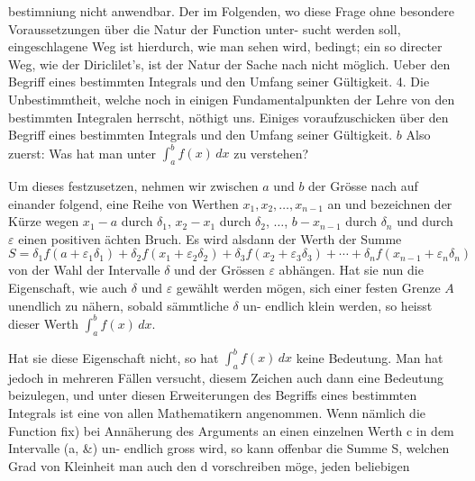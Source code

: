 \documentclass[12pt,a4paper]{book}
\theoremstyle{definition}
\theoremstyle{remark}
\begin{document}
{{%
bestimniung  nicht  anwendbar.  Der  im  Folgenden,  wo  diese  Frage
ohne  besondere  Voraussetzungen  über  die  Natur  der  Function  unter-
sucht werden  soll,  eingeschlagene  Weg  ist  hierdurch,  wie  man  sehen
wird,  bedingt;  ein  so  directer  Weg,  wie  der  Diriclilet's,  ist  der  Natur
der  Sache  nach  nicht  möglich.
Ueber  den  Begriff  eines  bestimmten  Integrals  und  den  Umfang
seiner  Gültigkeit.
4.
Die  Unbestimmtheit,  welche  noch  in  einigen  Fundamentalpunkten
der  Lehre  von  den  bestimmten  Integralen  herrscht,  nöthigt  uns.
Einiges  voraufzuschicken  über  den  Begriff  eines  bestimmten  Integrals
und  den  Umfang  seiner  Gültigkeit.
$b$
Also  zuerst:  Was  hat  man  unter  $\int_a^b f(x)\, dx$  zu  verstehen?

Um  dieses  festzusetzen,  nehmen  wir  zwischen  $a$  und  $b$  der  Grösse
nach  auf  einander  folgend,  eine  Reihe  von  Werthen  $x_1, x_2, \ldots, x_{n-1}$
an  und  bezeichnen  der  Kürze  wegen  $x_1 - a$  durch  $\delta_1$,  $x_2 - x_1$  durch
$\delta_2$,  $\ldots$,  $b - x_{n-1}$  durch  $\delta_n$  und  durch  $\varepsilon$  einen  positiven  ächten  Bruch.
Es  wird  alsdann  der  Werth  der  Summe
\[ S = \delta_1 f(a + \varepsilon_1 \delta_1) + \delta_2 f(x_1 + \varepsilon_2 \delta_2) + \delta_3 f(x_2 + \varepsilon_3 \delta_3) + \cdots + \delta_n f(x_{n-1} + \varepsilon_n \delta_n) \]
von  der  Wahl  der  Intervalle  $\delta$  und  der  Grössen  $\varepsilon$  abhängen.  Hat  sie
nun  die  Eigenschaft,  wie  auch  $\delta$  und  $\varepsilon$  gewählt  werden  mögen,  sich
einer  festen  Grenze  $A$  unendlich  zu  nähern,  sobald  sämmtliche  $\delta$  un-
endlich  klein  werden,  so  heisst  dieser  Werth  $\int_a^b f(x)\, dx$.

Hat  sie  diese  Eigenschaft  nicht,  so  hat  $\int_a^b f(x)\, dx$  keine  Bedeutung.
Man  hat  jedoch  in  mehreren  Fällen  versucht,  diesem  Zeichen  auch
dann  eine  Bedeutung  beizulegen,  und  unter  diesen  Erweiterungen  des
Begriffs  eines  bestimmten  Integrals  ist  eine  von  allen  Mathematikern
angenommen.  Wenn  nämlich  die  Function  fix)  bei  Annäherung  des
Arguments  an  einen  einzelnen  Werth  c  in  dem  Intervalle  (a,  \&)  un-
endlich gross  wird,  so  kann  offenbar  die  Summe  S,  welchen  Grad
von  Kleinheit  man  auch   den   d  vorschreiben   möge,  jeden  beliebigen
\newpage

}}
\end{document}

